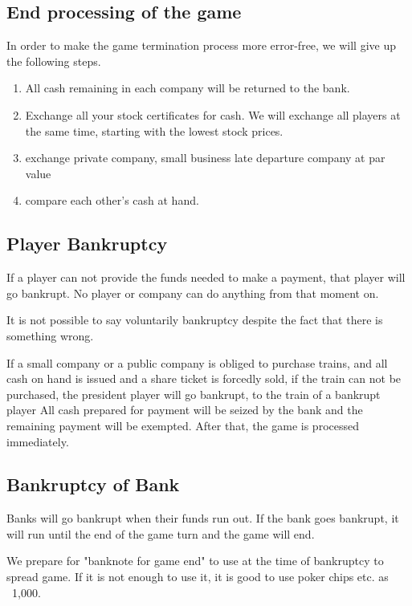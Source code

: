 \documentclass{article}
\begin{document}
\begin{CJK}{UTF8}{min}
\subsection{End processing of the game}

In order to make the game termination process more error-free, we will
give up the following steps.

\begin{enumerate}
\item All cash remaining in each company will be returned to the bank.
\item Exchange all your stock certificates for cash. We will exchange
  all players at the same time, starting with the lowest stock prices.
\item exchange private company, small business late departure company
  at par value
\item compare each other's cash at hand.
\end{enumerate}

\subsection{Player Bankruptcy}

If a player can not provide the funds needed to make a payment, that
player will go bankrupt. No player or company can do anything from
that moment on.

It is not possible to say voluntarily bankruptcy despite the fact that
there is something wrong.

If a small company or a public company is obliged to purchase trains,
and all cash on hand is issued and a share ticket is forcedly sold, if
the train can not be purchased, the president player will go bankrupt,
to the train of a bankrupt player All cash prepared for payment will
be seized by the bank and the remaining payment will be
exempted. After that, the game is processed immediately.

\subsection{Bankruptcy of Bank}

Banks will go bankrupt when their funds run out. If the bank goes
bankrupt, it will run until the end of the game turn and the game will
end.

We prepare for "banknote for game end" to use at the time of
bankruptcy to spread game. If it is not enough to use it, it is good
to use poker chips etc. as \ 1,000.


\end{CJK}
\end{document}
